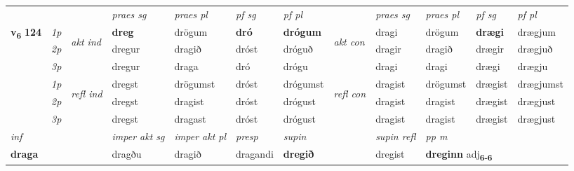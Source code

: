\begin{longtable}[l]{X>{\footnotesize\itshape}llXXXXlXXXX}
 & &   & \textit{praes sg}  & \textit{praes pl}    & \textit{ pf sg} & \textit{pf pl} & & \textit{praes sg}  & \textit{praes pl}    & \textit{pf sg} & \textit{pf pl }  \\ \cmidrule{4-7} \cmidrule{9-12}
 \multirow{2}{*}{{{\textbf{v{\textsubscript{6}}} \Large{\textbf{124}}}}}  & 1p & \multirow{3}{*}{\begin{turn}{90}\textit{akt ind}\end{turn}} & \textbf{dreg} & drögum & \textbf{dró} & \textbf{drógum} & \multirow{3}{*}{\begin{turn}{90}\textit{akt con}\end{turn}} &dragi & drögum & \textbf{drægi} & drægjum\\*
 & 2p &  &  dregur  & dragið & dróst & dróguð & & dragir & dragið & drægir & drægjuð \\*
 & 3p &  & dregur & draga & dró & drógu & & dragi & dragi& drægi & drægju \\*
\cmidrule{4-7} \cmidrule{9-12}
 & 1p & \multirow{3}{*}{\begin{turn}{90}\textit{refl ind}\end{turn}}  & dregst & drögumst & dróst & drógumst & \multirow{3}{*}{\begin{turn}{90}\textit{refl con}\end{turn}}  &dragist & drögumst & drægist & drægjumst \\*
 & 2p &  & dregst & dragist & dróst & drógust & &dragist & dragist & drægist & drægjust \\*
 & 3p  & & dregst & dragast & dróst & drógust & & dragist & dragist& drægist & drægjust \\*
\cmidrule{4-7} \cmidrule{9-12}

   {\textit{inf}} & &  & \textit{imper akt sg} & \textit{imper akt pl}   & \textit{presp} & \textit{supin} && \textit{supin refl} & \textit{pp m} \\*
  {\textbf{draga}} & && dragðu  & dragið   & dragandi &  \textbf{dregið} && dregist & \multicolumn{2}{l}{\textbf{dreginn} adj\textbf{\textsubscript{6-6}}} \\*

\midrule


\end{longtable}
